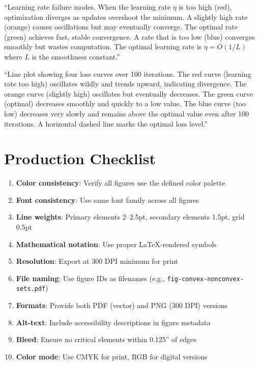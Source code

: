 \documentclass[12pt]{article}
\begin{document}
\begin{description}[style=nextline, leftmargin=0pt]
    \item[Caption Text]
    ``Learning rate failure modes. When the learning rate $\eta$ is too high (red), optimization diverges as updates overshoot the minimum. A slightly high rate (orange) causes oscillations but may eventually converge. The optimal rate (green) achieves fast, stable convergence. A rate that is too low (blue) converges smoothly but wastes computation. The optimal learning rate is $\eta = O(1/L)$ where $L$ is the smoothness constant.''

    \item[Alt-Text for Accessibility]
    ``Line plot showing four loss curves over 100 iterations. The red curve (learning rate too high) oscillates wildly and trends upward, indicating divergence. The orange curve (slightly high) oscillates but eventually decreases. The green curve (optimal) decreases smoothly and quickly to a low value. The blue curve (too low) decreases very slowly and remains above the optimal value even after 100 iterations. A horizontal dashed line marks the optimal loss level.''
\end{description}

\newpage

\section{Production Checklist}

\begin{enumerate}
    \item \textbf{Color consistency}: Verify all figures use the defined color palette
    \item \textbf{Font consistency}: Use same font family across all figures
    \item \textbf{Line weights}: Primary elements 2--2.5pt, secondary elements 1.5pt, grid 0.5pt
    \item \textbf{Mathematical notation}: Use proper LaTeX-rendered symbols
    \item \textbf{Resolution}: Export at 300 DPI minimum for print
    \item \textbf{File naming}: Use figure IDs as filenames (e.g., \texttt{fig-convex-nonconvex-sets.pdf})
    \item \textbf{Formats}: Provide both PDF (vector) and PNG (300 DPI) versions
    \item \textbf{Alt-text}: Include accessibility descriptions in figure metadata
    \item \textbf{Bleed}: Ensure no critical elements within 0.125'' of edges
    \item \textbf{Color mode}: Use CMYK for print, RGB for digital versions
\end{enumerate}
\end{document}
